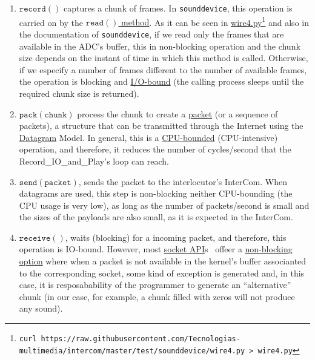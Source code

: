 \begin{enumerate}
\item $\mathtt{record()}$ captures a chunk of frames. In
  \texttt{sounddevice}, this operation is carried on by the
  \href{https://python-sounddevice.readthedocs.io/en/0.4.0/api/streams.html#sounddevice.Stream.read}{$\mathtt{read()}$
    method}. As it can be seen in
  \href{https://raw.githubusercontent.com/Tecnologias-multimedia/intercom/master/test/sounddevice/wire4.py}{wire4.py}\footnote{
  \texttt{curl
    https://raw.githubusercontent.com/Tecnologias-multimedia/intercom/master/test/sounddevice/wire4.py
    > wire4.py}} and also in the documentation of
  \texttt{sounddevice}, if we read only the frames that are available
  in the ADC's buffer, this in non-blocking operation and the chunk
  size depends on the instant of time in which this method is
  called. Otherwise, if we especify a number of frames different to
  the number of available frames, the operation is blocking and
  \href{https://en.wikipedia.org/wiki/I/O_bound}{I/O-bound} (the
  calling process sleeps until the required chunk size is returned).

\item $\mathtt{pack(chunk)}$ process the chunk to create a
  \href{https://en.wikipedia.org/wiki/Network_packet}{packet} (or a
  sequence of packets), a structure that can be transmitted through
  the Internet using the
  \href{https://en.wikipedia.org/wiki/Datagram}{Datagram} Model. In
  general, this is a
  \href{https://en.wikipedia.org/wiki/CPU-bound}{CPU-bounded}
  (CPU-intensive) operation, and therefore, it reduces the number of
  cycles/second that the Record\_IO\_and\_Play's loop can reach.

\item $\mathtt{send(packet)}$, sends the packet to the interlocutor's
  InterCom. When datagrams are used, this step is non-blocking neither
  CPU-bounding (the CPU usage is very low), as long as the number of
  packets/second is small and the sizes of the payloads are also
  small, as it is expected in the InterCom.

\item $\mathtt{receive()}$, waits (blocking) for a incoming packet,
  and therefore, this operation is IO-bound. However, most
  \href{https://docs.python.org/3/library/socket.html}{socket
    API}s~\cite{python} offeer a
  \href{https://docs.python.org/3.8/library/socket.html#socket.socket.setblocking}{non-blocking
    option} where when a packet is not available in the kernel's
  buffer associanted to the corresponding socket, some kind of
  exception is generated and, in this case, it is resposabability of
  the programmer to generate an ``alternative'' chunk (in our case, for
  example, a chunk filled with zeros will not produce any sound).


\end{enumerate}
